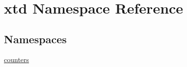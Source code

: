 \hypertarget{namespacextd}{}\section{xtd Namespace Reference}
\label{namespacextd}
\subsection*{Namespaces}
\begin{DoxyCompactItemize}
\item 
 \hyperlink{namespacextd_1_1counters}{counters}
\end{DoxyCompactItemize}
